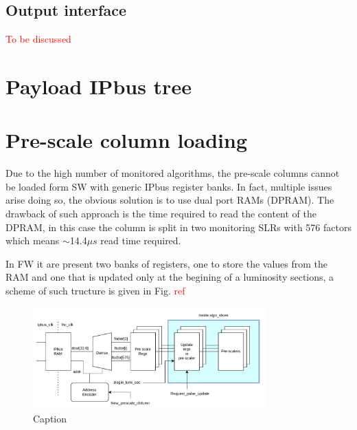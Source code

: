 \documentclass[a4paper,11pt]{article}
\begin{document}
\subsection{Output interface}
\textcolor{red}{To be discussed}


\section{Payload IPbus tree}

\section{Pre-scale column loading}
Due to the high number of monitored algorithms, the pre-scale columns cannot be loaded form SW with generic IPbus register banks. In fact, multiple issues arise doing so, the obvious solution is to use dual port RAMs (DPRAM). The drawback of such approach is the time required to read the content of the DPRAM, in this case the column is split in two monitoring SLRs with 576 factors which means $\sim$14.4$\mu s$ read time required.  

In FW it are present two banks of registers, one to store the values from the RAM and one that is updated only at the begining of a luminosity sections, a scheme of such tructure is given in Fig. \textcolor{red}{ref}

\begin{figure}[h]
    \centering
    \includegraphics[width=0.8\textwidth]{Images/Prescale-section/Prescaler_load.pdf}
    \caption{Caption}
    \label{fig:my_label}
\end{figure}
\end{document}
